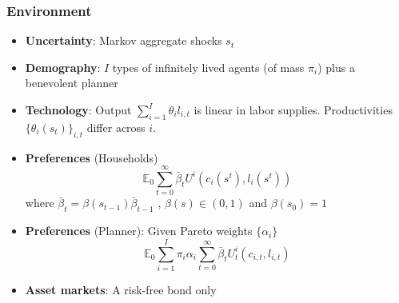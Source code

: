 \documentclass{beamer}
\begin{document}
\begin{frame}
 \frametitle{Environment}
 \begin{itemize}
 \item \textbf{Uncertainty}: Markov aggregate shocks $s_t$
  \item \textbf{Demography}: $I$ types of infinitely lived agents (of mass $\pi_i$)  plus a benevolent planner
  \item \textbf{Technology}: Output $\sum_{i=1}^I \theta_i l_{i,t}$ is linear in labor supplies. Productivities $\{\theta_i(s_t)\}_{i,t}$ differ across $i$.
  \item \textbf{Preferences }(Households)
  \begin{equation*}
\mathbb{E}_{0}\sum_{t=0}^{\infty } \bar{\beta}_t  U^{i}\left(
c_{i}(s^t),l_{i}(s^t)\right)  \label{utility lifetime}
\end{equation*}%
where $\bar{\beta}_t=\beta(s_{t-1}) \bar{\beta}_{t-1}$ , $\beta(s)\in (0,1)$ and  $\beta(s_0)=1$
\item \textbf{Preferences} (Planner): Given Pareto weights $\{\alpha_i\}$
\begin{equation*}
\mathbb{E}_{0}\sum_{i=1}^{I}\pi _{i}\alpha _{i}\sum_{t=0}^{\infty }\bar{\beta}_t U_{t}^{i}\left( c_{i,t},l_{i,t}\right)  \label{govmt objective}
\end{equation*}
  \item \textbf{Asset markets}: A risk-free bond only
  \end{itemize}

\end{frame}
\end{document}
